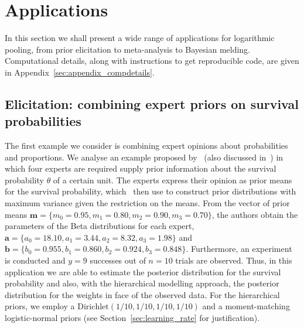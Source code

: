 \documentclass[12pt]{article}
\begin{document}
\section{Applications}
\label{sec:apps}

In this section we shall present a wide range of applications for logarithmic pooling, from prior elicitation to meta-analysis to Bayesian melding.
Computational details, along with instructions to get reproducible code, are given in  Appendix~\ref{sec:appendix_compdetails}.

\subsection{Elicitation: combining expert priors on survival probabilities}
\label{sec:survivalProbs}

The first example we consider is combining expert opinions about probabilities and proportions.
We analyse an example proposed by~\textcite{Savchuk1994} (also discussed in~\textcite{Rufo2012B}) in which four experts are required supply prior information about the survival probability $\theta$ of a certain unit.
The experts express their opinion as prior means for the survival probability, which~\textcite{Savchuk1994} then use to construct prior distributions with maximum variance given the restriction on the means.
From the vector of prior means $\mathbf{m} = \{ m_0 = 0.95, m_1 = 0.80, m_2 = 0.90, m_3 = 0.70 \}$, the authors obtain the parameters of the Beta distributions for each expert,  $\mathbf{a} = \{ a_0 = 18.10, a_1 = 3.44 , a_2 = 8.32, a_3 = 1.98 \}$ and  $\mathbf{b} = \{ b_0 = 0.955 , b_1 = 0.860, b_2 = 0.924, b_3 = 0.848\}$.
Furthermore, an experiment is conducted and $y = 9$ successes out of $n = 10$ trials are observed.
Thus, in this application we are able to estimate the posterior distribution for the survival probability and also, with  the hierarchical modelling approach, the posterior distribution for the weights in face of the observed data.
For the hierarchical priors, we employ a $\text{Dirichlet}(1/10, 1/10, 1/10, 1/10)$ and a moment-matching logistic-normal priors (see Section~\ref{sec:learning_rate} for justification).
\end{document}
